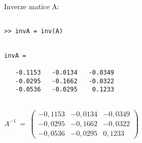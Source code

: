 \documentclass[a4paper,10pt]{article}
\begin{document}

\newpage
\par Inverze matice A:

\begin{verbatim}

>> invA = inv(A)

\end{verbatim}

\begin{minipage}[t]{.5\textwidth}
\begin{verbatim}

invA =

   -0.1153   -0.0134   -0.0349
   -0.0295   -0.1662   -0.0322
   -0.0536   -0.0295    0.1233
  
\end{verbatim}
\end{minipage}%
\begin{minipage}[t]{.5\textwidth}

\bigskip
\bigskip

$
A^{-1}~=~
\left( \begin{array}{rrr}
   -0,1153  & -0,0134  & -0,0349 \\
   -0,0295  & -0,1662  & -0,0322 \\
   -0,0536  & -0,0295  &  0,1233
\end{array} \right)
$

\vfill

\end{minipage}



\end{document}
